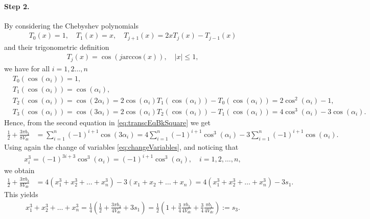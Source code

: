 \documentclass[a4paper]{article}
\numberwithin{equation}{section}
\begin{document}
{\paragraph{Step 2.} By considering the Chebyshev polynomials 
\begin{align*}
	T_0(x) = 1, \quad T_1(x) = x, \quad T_{j+1}(x) = 2xT_j(x)-T_{j-1}(x)
\end{align*}
and their trigonometric definition 
\begin{align*}
	T_j(x) = \cos(j\mbox{arccos}(x)),\quad |x|\leq 1,
\end{align*}
we have for all $i=1,2\ldots,n$
\begin{align*}
	&T_0(\cos(\alpha_i)) = 1,
	\\
	&T_1(\cos(\alpha_i)) = \cos(\alpha_i),
	\\
	&T_2(\cos(\alpha_i)) = \cos(2\alpha_i) = 2\cos(\alpha_i)T_1(\cos(\alpha_i)) -T_0(\cos(\alpha_i)) = 2\cos^2(\alpha_i)-1,
	\\
	&T_3(\cos(\alpha_i)) = \cos(3\alpha_i) = 2\cos(\alpha_i)T_2(\cos(\alpha_i)) -T_1(\cos(\alpha_i)) = 4\cos^3(\alpha_i)-3\cos(\alpha_i).
\end{align*}
Hence, from the second equation in \eqref{eq:transcEqBkSquare} we get
\begin{align*}
	\frac 12 + \frac{3\pi b_3}{8V_{dc}} & = \sum_{i=1}^n (-1)^{i+1} \cos (3\alpha_i) = 4\sum_{i=1}^n (-1)^{i+1} \cos^3(\alpha_i) - 3\sum_{i=1}^n (-1)^{i+1} \cos(\alpha_i).
\end{align*}
Using again the change of variables \eqref{eq:changeVariables}, and noticing that 
\begin{align*}
	x_i^3 = (-1)^{3i+3}\cos^3(\alpha_i) = (-1)^{i+1}\cos^3(\alpha_i), \quad i=1,2,\ldots,n,
\end{align*} 
we obtain
\begin{align*}
	\frac 12 + \frac{3\pi b_3}{8V_{dc}} & = 4(x_1^3 + x_2^3 + \ldots + x_n^3) - 3(x_1 + x_2 + \ldots + x_n) = 4(x_1^3 + x_2^3 + \ldots + x_n^3) - 3s_1.
\end{align*}
This yields
\begin{align*}
	x_1^3 + x_2^3 + \ldots + x_n^3 = \frac 14\left(\frac 12 + \frac{3\pi b_3}{4V_{dc}} + 3s_1\right) = \frac 12\left(1 + \frac 34\frac{\pi b_3}{4V_{dc}} + \frac 34\frac{\pi b_1}{4V_{dc}}\right):=s_3.
\end{align*}

}
\end{document}
